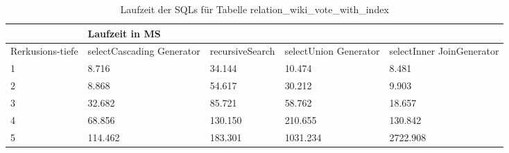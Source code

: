 \begin{table}[H]
	\centering
	\begin{tabular}{l|l|l|l|l|l|}
		\cline{2-6}
		& \multicolumn{5}{|l|}{Laufzeit in MS}                                                                                                                                                  \\ \hline
		\multicolumn{1}{|l|}{\multirow{2}{2cm}{Rerkusions-tiefe}} & \multicolumn{2}{|l|}{\multirow{2}{3cm}{selectCascading Generator}} & \multirow{2}{2.8cm}{recursiveSearch} & \multirow{2}{2.5cm}{selectUnion Generator} & \multirow{2}{2.5cm}{selectInner JoinGenerator} \\
		\multicolumn{1}{|l|}{}
		& \multicolumn{2}{|l|}{}                                           &                                  &                                     &                                           \\ \hline
		
	\multicolumn{1}{|l|}{1}                                 & \multicolumn{2}{l|}{8.716}                                       & 34.144                                                & 10.474                                                    & 8.481                                                           \\ \hline
	\multicolumn{1}{|l|}{2}                                 & \multicolumn{2}{l|}{8.868}                                       & 54.617                                                & 30.212                                                    & 9.903                                                           \\ \hline
	\multicolumn{1}{|l|}{3}                                 & \multicolumn{2}{l|}{32.682}                                      & 85.721                                                & 58.762                                                    & 18.657                                                          \\ \hline
	\multicolumn{1}{|l|}{4}                                 & \multicolumn{2}{l|}{68.856}                                      & 130.150                                               & 210.655                                                   & 130.842                                                         \\ \hline
	\multicolumn{1}{|l|}{5}                                 & \multicolumn{2}{l|}{114.462}                                     & 183.301                                               & 1031.234                                                  & 2722.908                                                        \\ \hline
	
	\end{tabular}
	\caption{Laufzeit der SQLs für Tabelle relation\_wiki\_vote\_with\_index}
\end{table}

